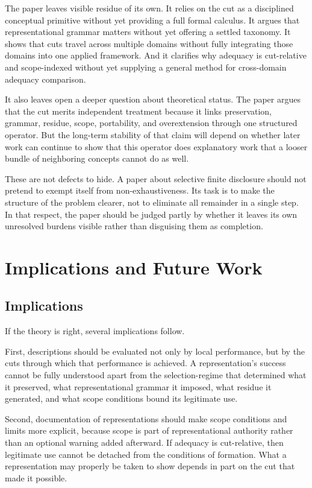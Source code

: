 \documentclass[11pt]{article}
\begin{document}
The paper leaves visible residue of its own. It relies on the cut as a disciplined conceptual primitive without yet providing a full formal calculus. It argues that representational grammar matters without yet offering a settled taxonomy. It shows that cuts travel across multiple domains without fully integrating those domains into one applied framework. And it clarifies why adequacy is cut-relative and scope-indexed without yet supplying a general method for cross-domain adequacy comparison.

It also leaves open a deeper question about theoretical status. The paper argues that the cut merits independent treatment because it links preservation, grammar, residue, scope, portability, and overextension through one structured operator. But the long-term stability of that claim will depend on whether later work can continue to show that this operator does explanatory work that a looser bundle of neighboring concepts cannot do as well.

These are not defects to hide. A paper about selective finite disclosure should not pretend to exempt itself from non-exhaustiveness. Its task is to make the structure of the problem clearer, not to eliminate all remainder in a single step. In that respect, the paper should be judged partly by whether it leaves its own unresolved burdens visible rather than disguising them as completion.
\section{Implications and Future Work}

\subsection{Implications}

If the theory is right, several implications follow.

First, descriptions should be evaluated not only by local performance, but by the cuts through which that performance is achieved. A representation's success cannot be fully understood apart from the selection-regime that determined what it preserved, what representational grammar it imposed, what residue it generated, and what scope conditions bound its legitimate use.

Second, documentation of representations should make scope conditions and limits more explicit, because scope is part of representational authority rather than an optional warning added afterward. If adequacy is cut-relative, then legitimate use cannot be detached from the conditions of formation. What a representation may properly be taken to show depends in part on the cut that made it possible.
\end{document}
